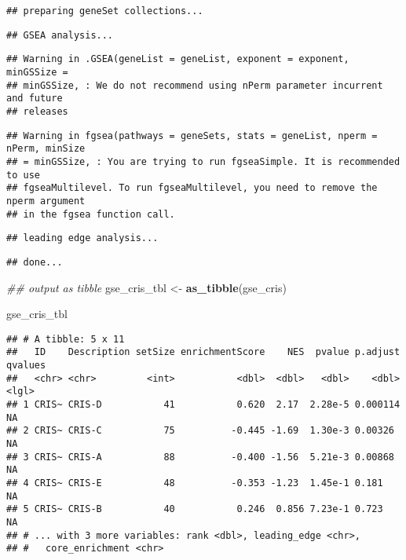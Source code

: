 \documentclass[
]{article}
\newenvironment{Shaded}{\begin{snugshade}}{\end{snugshade}}
\newcommand{\CommentTok}[1]{\textcolor[rgb]{0.56,0.35,0.01}{\textit{#1}}}
\newcommand{\KeywordTok}[1]{\textcolor[rgb]{0.13,0.29,0.53}{\textbf{#1}}}
\newcommand{\NormalTok}[1]{#1}
\newcommand{\StringTok}[1]{\textcolor[rgb]{0.31,0.60,0.02}{#1}}
\begin{document}
\begin{verbatim}
## preparing geneSet collections...
\end{verbatim}

\begin{verbatim}
## GSEA analysis...
\end{verbatim}

\begin{verbatim}
## Warning in .GSEA(geneList = geneList, exponent = exponent, minGSSize =
## minGSSize, : We do not recommend using nPerm parameter incurrent and future
## releases
\end{verbatim}

\begin{verbatim}
## Warning in fgsea(pathways = geneSets, stats = geneList, nperm = nPerm, minSize
## = minGSSize, : You are trying to run fgseaSimple. It is recommended to use
## fgseaMultilevel. To run fgseaMultilevel, you need to remove the nperm argument
## in the fgsea function call.
\end{verbatim}

\begin{verbatim}
## leading edge analysis...
\end{verbatim}

\begin{verbatim}
## done...
\end{verbatim}

\begin{Shaded}
\begin{Highlighting}[]
\CommentTok{## output as tibble}
\NormalTok{gse_cris_tbl <-}\StringTok{ }\KeywordTok{as_tibble}\NormalTok{(gse_cris)}

\NormalTok{gse_cris_tbl}
\end{Highlighting}
\end{Shaded}

\begin{verbatim}
## # A tibble: 5 x 11
##   ID    Description setSize enrichmentScore    NES  pvalue p.adjust qvalues
##   <chr> <chr>         <int>           <dbl>  <dbl>   <dbl>    <dbl> <lgl>  
## 1 CRIS~ CRIS-D           41           0.620  2.17  2.28e-5 0.000114 NA     
## 2 CRIS~ CRIS-C           75          -0.445 -1.69  1.30e-3 0.00326  NA     
## 3 CRIS~ CRIS-A           88          -0.400 -1.56  5.21e-3 0.00868  NA     
## 4 CRIS~ CRIS-E           48          -0.353 -1.23  1.45e-1 0.181    NA     
## 5 CRIS~ CRIS-B           40           0.246  0.856 7.23e-1 0.723    NA     
## # ... with 3 more variables: rank <dbl>, leading_edge <chr>,
## #   core_enrichment <chr>
\end{verbatim}
\end{document}
